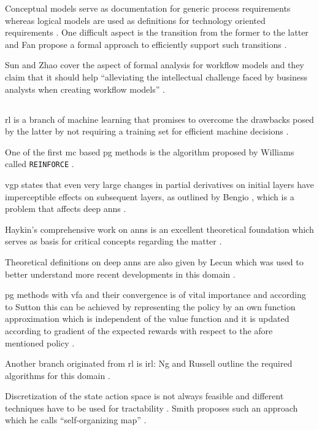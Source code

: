 \documentclass{seal_thesis}
\begin{document}
Conceptual models serve as documentation for generic process requirements whereas logical models are used as definitions for technology oriented requirements \cite{Fan2012}. One difficult aspect is the transition from the former to the latter and Fan \etal propose a formal approach to efficiently support such transitions \cite{Fan2012}.

Sun and Zhao cover the aspect of formal analysis for workflow models and they claim that it should help ``alleviating the intellectual challenge faced by business analysts when creating workflow models'' \cite{Sun2013}.

\subsection{}

\gls{rl} is a branch of machine learning that promises to overcome the drawbacks posed by the latter by not requiring a training set for efficient machine decisions \cite{Sutton2017}.

One of the first \gls{mc} based \gls{pg} methods is the algorithm proposed by Williams called \texttt{REINFORCE} \cite{Williams1992}.

\gls{vgp} states that even very large changes in partial derivatives on initial layers have imperceptible effects on subsequent layers, as outlined by Bengio \etal, which is a problem that affects deep \glspl{ann} \cite{Bengio1994}.

Haykin's comprehensive work on \glspl{ann} is an excellent theoretical foundation which serves as basis for critical concepts regarding the matter \cite{Haykin1998}.

Theoretical definitions on deep \glspl{ann} are also given by Lecun \etal which was used to better understand more recent developments in this domain \cite{Lecun1998}.

\gls{pg} methods with \gls{vfa} and their convergence is of vital importance and according to Sutton \etal this can be achieved by representing the policy by an own function approximation which is independent of the value function and it is updated according to gradient of the expected rewards with respect to the afore mentioned policy \cite{Sutton1999}.

Another branch originated from \gls{rl} is \gls{irl}: Ng and Russell outline the required algorithms for this domain \cite{Ng2000}.

Discretization of the state action space is not always feasible and different techniques have to be used for tractability \cite{Smith2002}. Smith proposes such an approach which he calls ``self-organizing map'' \cite{Smith2002}.
\end{document}
